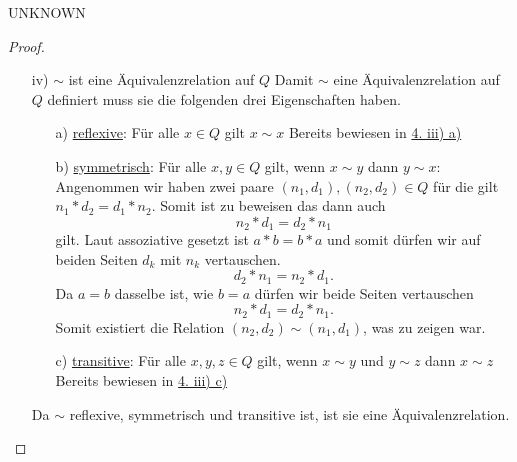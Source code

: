 \documentclass{problemset}
\begin{document}
\begin{problem}{UNKNOWN}
\begin{proof}
\begin{enumerate}
        \item [iv)] $\sim$ ist eine Äquivalenzrelation auf $Q$ \newline
              Damit $\sim$ eine Äquivalenzrelation auf $Q$ definiert muss sie die folgenden drei Eigenschaften haben.
              \begin{enumerate}
                  \item [a)] \underline{reflexive}: Für alle $x \in Q$ gilt $x \sim x$ \newline
                        Bereits bewiesen in \underline{4. iii) a)}
                  \item [b)] \underline{symmetrisch}: Für alle $x,y \in Q$ gilt, wenn $x \sim y$ dann $y \sim x$: \newline
                        Angenommen wir haben zwei paare $(n_1,d_1),(n_2,d_2) \in Q$ für die gilt $n_1*d_2=d_1*n_2$.
                        Somit ist zu beweisen das dann auch \[
                            n_2*d_1 = d_2*n_1
                        \] gilt. \newline\newline Laut assoziative gesetzt ist
                           $a*b = b*a$ und somit dürfen wir auf beiden Seiten
                           $d_k$ mit $n_k$ vertauschen.
                        \[
                            d_2*n_1=n_2*d_1.
                        \]
                        Da $a = b$ dasselbe ist, wie $b = a$ dürfen wir beide
                        Seiten vertauschen \[
                            n_2*d_1 = d_2*n_1.
                        \]
                        Somit existiert die Relation $(n_2,d_2) \sim (n_1,
                        d_1)$, was zu zeigen war.
                  \item [c)] \underline{transitive}: Für alle $x,y,z \in Q$ gilt, wenn $x \sim y$ und $y \sim z$ dann $x \sim z$ \newline
                        Bereits bewiesen in \underline{4. iii) c)}
              \end{enumerate}
              Da $\sim$ reflexive, symmetrisch und transitive ist, ist sie eine Äquivalenzrelation.
    \end{enumerate}
\end{proof}
\end{problem}
\end{document}
